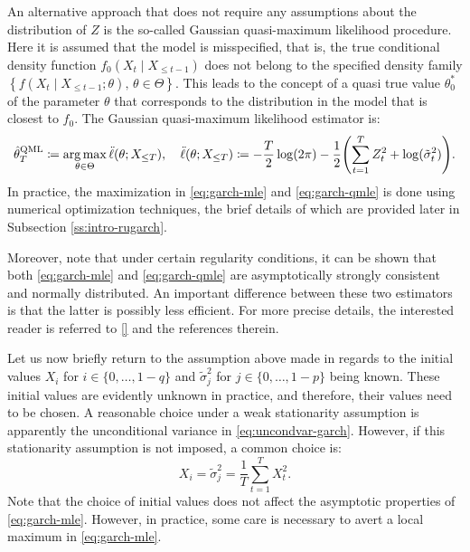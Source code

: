 An alternative approach that does not require any assumptions about the distribution of $Z$ is the so-called Gaussian quasi-maximum likelihood procedure. Here it is assumed that the model is misspecified, that is, the true conditional density function $f_{0}(X_{t}\mid X_{\leq t-1})$ does not belong to the specified density family $\left\{f(X_{t}\mid X_{\leq t-1};\theta),\,\theta\in\Theta\right\}$. This leads to the concept of a quasi true value $\theta_{0}^{*}$ of the parameter $\theta$ that corresponds to the distribution in the model that is closest to $f_{0}$. The Gaussian quasi-maximum likelihood estimator is:
\begin{equation}\label{eq:garch-qmle}
    \hat{\theta}_{T}^{\mathrm{QML}}\coloneqq\argmax_{\theta\in\Theta}\ddot{\ell}(\theta;X_{\leq T}),\quad\ddot{\ell}(\theta;X_{\leq T})\coloneqq-\frac{T}{2}\log(2\pi)-\frac{1}{2}\left(\sum_{t=1}^{T}Z_{t}^{2}+\log(\tilde{\sigma}_{t}^{2})\right).
\end{equation}
In practice, the maximization in \eqref{eq:garch-mle} and \eqref{eq:garch-qmle} is done using numerical optimization techniques, the brief details of which are provided later in Subsection \ref{ss:intro-rugarch}.

Moreover, note that under certain regularity conditions, it can be shown that both \eqref{eq:garch-mle} and \eqref{eq:garch-qmle} are asymptotically strongly consistent and normally distributed. An important difference between these two estimators is that the latter is possibly less efficient. For more precise details, the interested reader is referred to \ref{} and the references therein. %

Let us now briefly return to the assumption above made in regards to the initial values $X_{i}$ for $i\in\{0,\dots,1-q\}$ and $\tilde{\sigma}_{j}^{2}$ for ${j}\in\{0,\dots,1-p\}$ being known. These initial values are evidently unknown in practice, and therefore, their values need to be chosen. A reasonable choice under a weak stationarity assumption is apparently the unconditional variance in \eqref{eq:uncondvar-garch}. However, if this stationarity assumption is not imposed, a common choice is:
\begin{equation*}
    X_{i}=\tilde{\sigma}_{j}^{2}=\frac{1}{T}\sum_{t=1}^{T}X_{t}^{2}.
\end{equation*}
Note that the choice of initial values does not affect the asymptotic properties of \eqref{eq:garch-mle}. However, in practice, some care is necessary to avert a local maximum in \eqref{eq:garch-mle}.

